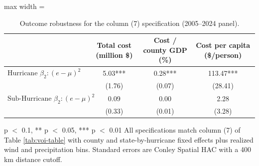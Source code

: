 \begin{table}

\caption{Outcome robustness for the column (7) specification (2005--2024 panel). \label{tab:appA_outcomes}}
\centering
\begin{adjustbox}{max width = \textwidth}
\begin{threeparttable}
\begin{tabular}[t]{lccc}
\toprule
  & Total cost (million \$) & Cost / county GDP (\%) & Cost per capita (\$/person)\\
\midrule
$\text{Hurricane } \beta_2: (e - \mu)^2$ & 5.03*** & 0.28*** & 113.47***\\
 & (1.76) & (0.07) & (28.41)\\
$\text{Sub-Hurricane } \beta_2: (e - \mu)^2$ & 0.09 & 0.00 & 2.28\\
 & (0.33) & (0.01) & (3.28)\\
\bottomrule
\end{tabular}
\begin{tablenotes}
\item * p $<$ 0.1, ** p $<$ 0.05, *** p $<$ 0.01 All specifications match column (7) of Table \ref{tab:voi-table} with county and state-by-hurricane fixed effects plus realized wind and precipitation bins. Standard errors are Conley Spatial HAC with a 400 km distance cutoff.
\end{tablenotes}
\end{threeparttable}
\end{adjustbox}
\end{table}
